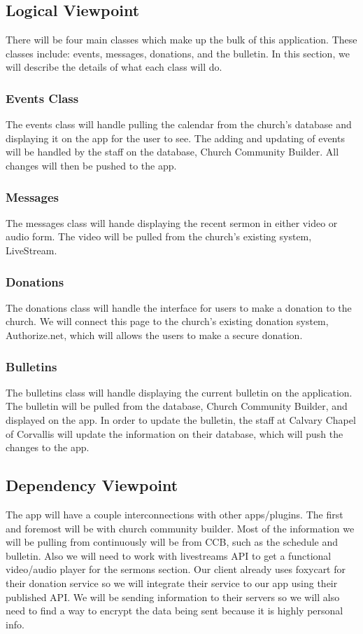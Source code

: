 \documentclass[letterpaper,10pt,draftclsnofoot,onecolumn,titlepage]{IEEEtran}
\begin{document}
		\subsection{Logical Viewpoint}
			There will be four main classes which make up the bulk of this application.
			These classes include: events, messages, donations, and the bulletin. 
			In this section, we will describe the details of what each class will do. 
			
			\subsubsection{Events Class}
				The events class will handle pulling the calendar from the church's database and displaying it on the app for the user to see. 
				The adding and updating of events will be handled by the staff on the database, Church Community Builder. 
				All changes will then be pushed to the app. 
				
				
			\subsubsection{Messages}
				The messages class will hande displaying the recent sermon in either video or audio form. 
				The video will be pulled from the church's existing system, LiveStream.
				
			\subsubsection{Donations}
				The donations class will handle the interface for users to make a donation to the church.
				We will connect this page to the church's existing donation system, Authorize.net, which will allows the users to make a secure donation. 
				
			\subsubsection{Bulletins}
				The bulletins class will handle displaying the current bulletin on the application. 
				The bulletin will be pulled from the database, Church Community Builder, and displayed on the app. 
				In order to update the bulletin, the staff at Calvary Chapel of Corvallis will update the information on their database, which will push the changes to the app. 
			
		\subsection{Dependency Viewpoint}
			The app will have a couple interconnections with other apps/plugins.
			The first and foremost will be with church community builder.
			Most of the information we will be pulling from continuously will be from CCB, such as the schedule and bulletin.
			Also we will need to work with livestreams API to get a functional video/audio player for the sermons section.
			Our client already uses foxycart for their donation service so we will integrate their service to our app using their published API.
			We will be sending information to their servers so we will also need to find a way to encrypt the data being sent because it is highly personal info.
\end{document}
